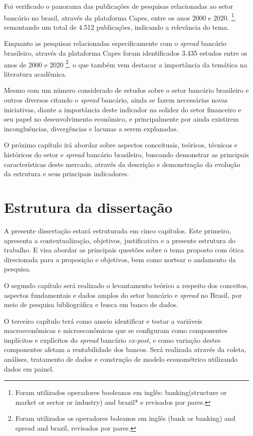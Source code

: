 \documentclass[12pt,openright,oneside,a4paper,chapter=TITLE,section=TITLE,subsection=TITLE,english,french,spanish,portugues,sumario=tradicional]{abntex2}
\begin{document}
Foi verificado o panorama das publicações de pesquisas relacionadas ao setor
bancário no brasil, através da plataforma Capes, entre os anos 2000 e 2020.
\footnote{Foram utilizados operadores booleanos em inglês: banking(structure or
market or sector or industry) and brazil* e revisados por pares.}, remontando um total de 4.512 publicações, indicando a relevância do tema.

Enquanto as pesquisas relacionadas especificamente com o \emph{spread} bancário
brasileiro, através da plataforma Capes foram identificados 3.435 estudos entre
os anos de 2000 e 2020 \footnote{Foram utilizados os operadores boleanos em
inglês (bank or banking) and spread and brazil, revisados por pares.}, o que
também vem destacar a importância da temática na literatura acadêmica.

Mesmo com um número considerado de estudos sobre o setor bancário brasileiro e
outros diversos citando o \emph{spread} bancário, ainda se fazem necessárias novas
iniciativas, diante a importância deste indicador na solidez do setor financeiro e seu papel no desenvolvimento econômico, e principalmente por ainda existirem incongluências, divergências e lacunas a serem explanadas.

O próximo capítulo irá abordar sobre aspectos conceituais, teóricos, técnicos e históricos do setor e \emph{spread} bancário brasileiro, buscando demonstrar as principais características deste mercado, através da descrição e demonstração da evolução da estrutura e seus principais indicadores.

\section{Estrutura da dissertação}

A presente dissertação estará estruturada em cinco capítulos. Este primeiro, apresenta a contextualização, objetivos, justificativa e a presente estrutura do trabalho. E visa abordar as principais questões sobre o tema proposto com ótica direcionada para a proposição e objetivos, bem como nortear o andamento da pesquisa.

O segundo capítulo será realizado o levantamento teórico a respeito dos
conceitos, aspectos fundamentais e dados amplos do setor bancário e \emph{spread} no Brasil, por meio de pesquisa bibliográfica e busca em banco de dados.

O terceiro capítulo terá como anseio identificar e testar a variáveis macroeconômicas e microeconômicas que se configuram como componentes implícitos e explícitos do \emph{spread} bancário \emph{ex-post}, e como variação destes componentes afetam a rentabilidade dos bancos. Será realizada através da coleta, análises, tratamento de dados e construção de modelo econométrico utilizando dados em painel.
\end{document}
